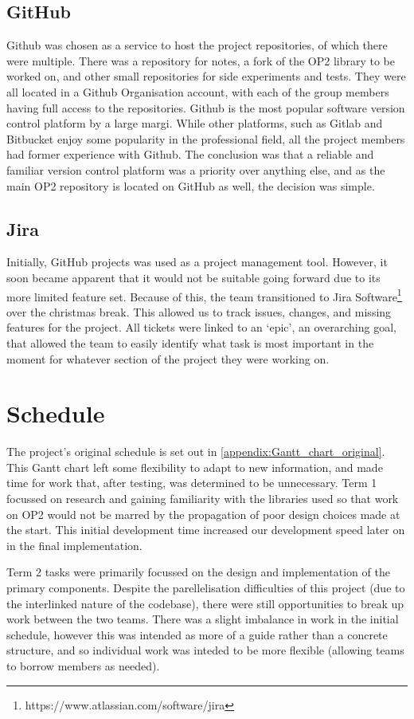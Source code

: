 \subsection{GitHub}
Github was chosen as a service to host the project repositories, of which there were multiple. There was a repository for notes, a fork of the OP2 library to be worked on, and other small repositories for side experiments and tests. They were all located in a Github Organisation account, with each of the group members having full access to the repositories. Github is the most popular software version control platform by a large margi\cite{stackoverflow_developer_survey}. While other platforms, such as Gitlab and Bitbucket enjoy some popularity in the professional field, all the project members had former experience with Github. The conclusion was that a reliable and familiar version control platform was a priority over anything else, and as the main OP2 repository is located on GitHub as well, the decision was simple.

\subsection{Jira} 
Initially, GitHub projects was used as a project management tool. However, it soon became apparent that it would not be suitable going forward due to its more limited feature set. Because of this, the team transitioned to Jira Software\footnote{https://www.atlassian.com/software/jira} over the christmas break. This allowed us to track issues, changes, and missing features for the project. All tickets were linked to an `epic', an overarching goal, that allowed the team to easily identify what task is most important in the moment for whatever section of the project they were working on.


\section{Schedule}
The project's original schedule is set out in \ref{appendix:Gantt_chart_original}. This Gantt chart left some flexibility to adapt to new information, and made time for work that, after testing, was determined to be unnecessary. Term 1 focussed on research and gaining familiarity with the libraries used so that work on OP2 would not be marred by the propagation of poor design choices made at the start. This initial development time increased our development speed later on in the final implementation. 

Term 2 tasks were primarily focussed on the design and implementation of the primary components. Despite the parellelisation difficulties of this project (due to the interlinked nature of the codebase), there were still opportunities to break up work between the two teams. There was a slight imbalance in work in the initial schedule, however this was intended as more of a guide rather than a concrete structure, and so individual work was inteded to be more flexible (allowing teams to borrow members as needed).

